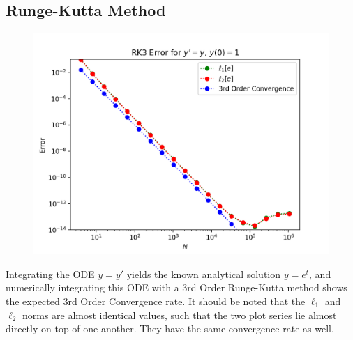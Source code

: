 \documentclass[10pt, reqno]{amsart}
\begin{document}
\begin{multicols}{2}
    \section{Runge-Kutta Method}
    \begin{figure}[H]
        \centering
        \includegraphics[width=1\linewidth]{RK3 Error Convergence (exp).png}
    \end{figure}
    Integrating the ODE $y = y'$ yields the known analytical solution $y = e^t$, and numerically integrating this ODE with a 3rd Order Runge-Kutta method shows the expected 3rd Order Convergence rate. It should be noted that the $\ell_1$ and $\ell_2$ norms are almost identical values, such that the two plot series lie almost directly on top of one another. They have the same convergence rate as well.


\end{multicols}
\end{document}
